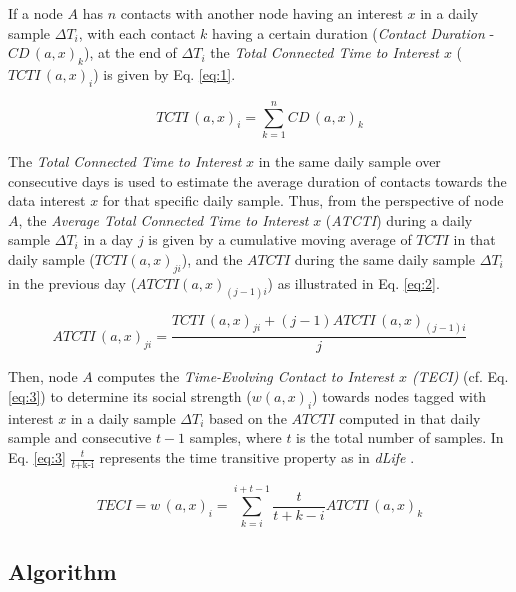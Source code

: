 \documentclass[lnicst]{svmultln}
\begin{document}
If a node $A$ has $n$ contacts with another node having an interest
$x$ in a daily sample $\Delta T_{i}$, with each contact $k$ having
a certain duration (\emph{Contact} \emph{Duration} - $CD\,(a,x)_{k}$),
at the end of $\Delta T_{i}$ the \emph{Total Connected Time to Interest
$x$} ($TCTI\,(a,x)_{i}$) is given by Eq. \ref{eq:1}.

\begin{equation}
TCTI\,(a,x)_{i}=\sum_{k=1}^{n}CD\,(a,x)_{k}\label{eq:1}
\end{equation}


The \emph{Total Connected Time to Interest} $x$ in the same daily
sample over consecutive days is used to estimate the average duration
of contacts towards the data interest $x$ for that specific daily
sample. Thus, from the perspective of node $A$, the \emph{Average
Total Connected Time to Interest} $x$ (\emph{ATCTI}) during a daily
sample $\Delta T_{i}$ in a day $j$ is given by a cumulative moving
average of $TCTI$ in that daily sample ($TCTI(a,x)_{ji}$), and the
$ATCTI$ during the same daily sample $\Delta T_{i}$ in the previous
day ($ATCTI(a,x)_{(j-1)i}$) as illustrated in Eq. \ref{eq:2}.

{\small 
\begin{equation}
ATCTI\,(a,x)_{ji}=\frac{{TCTI\,(a,x)_{ji}+(j-1)ATCTI\,(a,x)_{(j-1)i}}}{j}\label{eq:2}
\end{equation}
}{\small \par}

Then, node $A$ computes the \emph{Time-Evolving Contact to Interest
$x$ (TECI)} (cf. Eq. \ref{eq:3}) to determine its social strength
($w(a,x)_{i}$) towards nodes tagged with interest $x$ in a daily
sample $\Delta T_{i}$ based on the $ATCTI$ computed in that daily
sample and consecutive $t-1$ samples, where $t$ is the total number
of samples. In Eq. \ref{eq:3} $\frac{t}{t\text{+k-i}}$ represents
the time transitive property as in \emph{dLife} \cite{dlife}.

\begin{equation}
TECI=w\,(a,x)_{i}=\sum_{k=i}^{i+t-1}\frac{t}{t+k-i}ATCTI\,(a,x)_{k}\label{eq:3}
\end{equation}



\subsection{Algorithm}
\end{document}
